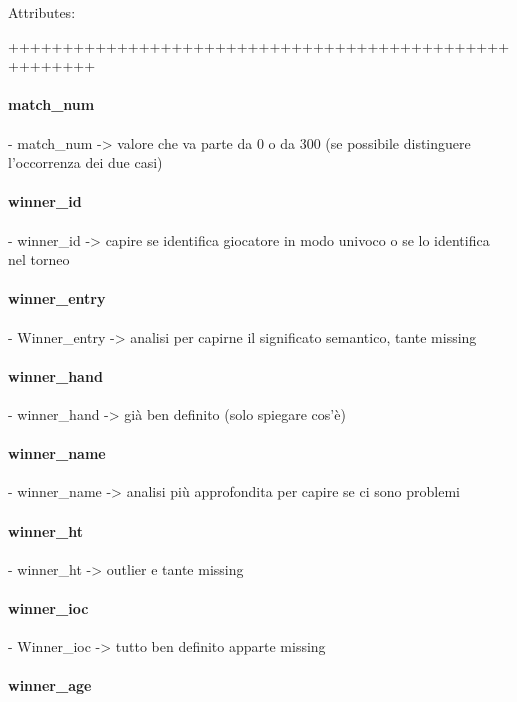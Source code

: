 \documentclass{article}
\begin{document}
\newpage

Attributes:


++++++++++++++++++++++++++++++++++++++++++++++++++++++ 

\paragraph{match\_num}

- match_num -> valore che va parte da 0 o da 300 (se possibile distinguere l'occorrenza dei due casi)

\paragraph{winner\_id}

- winner_id -> capire se identifica giocatore in modo univoco o se lo identifica nel torneo

\paragraph{winner\_entry}

- Winner_entry -> analisi per capirne il significato semantico, tante missing

\paragraph{winner\_hand}

- winner_hand -> già ben definito (solo spiegare cos'è)

\paragraph{winner\_name}

- winner_name -> analisi più approfondita per capire se ci sono problemi

\paragraph{winner\_ht}

- winner_ht -> outlier e tante missing

\paragraph{winner\_ioc}

- Winner_ioc -> tutto ben definito apparte missing

\paragraph{winner\_age}
\end{document}
